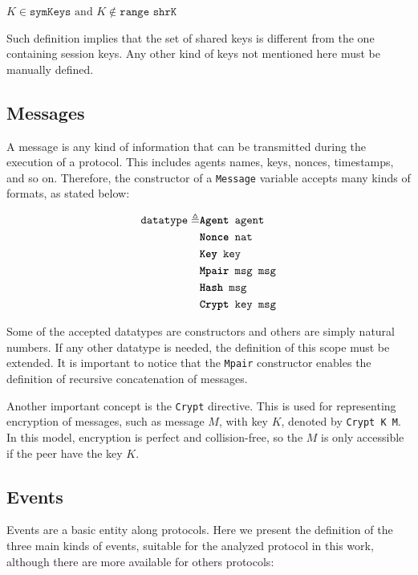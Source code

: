 \begin{center}
  $K \in \texttt{symKeys} \text{ and } K \notin \texttt{range shrK}$
\end{center}

Such definition implies that the set of shared keys is different from the one containing session keys. Any other kind of keys not mentioned here must be manually defined.

\subsection{Messages}
A message is any kind of information that can be transmitted during the execution of a protocol. This includes agents names, keys, nonces, timestamps, and so on. Therefore, the constructor of a \texttt{Message} variable accepts many kinds of formats, as stated below:

\begin{equation*}
  \begin{split}
    \texttt{datatype} \triangleq
    & \texttt{\textbf{Agent} agent} \\
    & \texttt{\textbf{Nonce} nat} \\
    & \texttt{\textbf{Key} key} \\
    & \texttt{\textbf{Mpair} msg msg} \\
    & \texttt{\textbf{Hash} msg} \\
    & \texttt{\textbf{Crypt} key msg}
  \end{split}
\end{equation*}

Some of the accepted datatypes are constructors and others are simply natural numbers. If any other datatype is needed, the definition of this scope must be extended. It is important to notice that the \texttt{Mpair} constructor enables the definition of recursive concatenation of messages.

Another important concept is the \texttt{Crypt} directive. This is used for representing encryption of messages, such as message $M$, with key $K$, denoted by \texttt{Crypt K M}. In this model, encryption is perfect and collision-free, so the $M$ is only accessible if the peer have the key $K$.

\subsection{Events}
Events are a basic entity along protocols. Here we present the definition of the three main kinds of events, suitable for the analyzed protocol in this work, although there are more available for others protocols:

